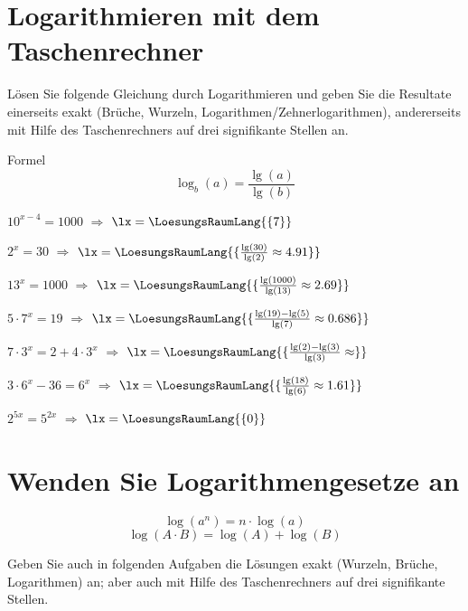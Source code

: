 \platzFuerBerechnungenBisEndeSeite{}

\section{Logarithmieren mit dem Taschenrechner}
Lösen Sie folgende Gleichung durch Logarithmieren und geben Sie die
Resultate einerseits exakt (Brüche, Wurzeln, Logarithmen/Zehnerlogarithmen), andererseits mit
Hilfe des Taschenrechners auf drei signifikante Stellen an.

Formel
$$\log_b(a) = \frac{\lg(a)}{\lg(b)}$$

\begin{bbwAufgabenBlock}
\item $10^{x-4}=1000$ $\Longrightarrow$ $\lx=\LoesungsRaumLang{\{7\}}$ \plz{}
\item $2^x=30$ $\Longrightarrow$ $\lx=\LoesungsRaumLang{\{\frac{\lg(30)}{\lg(2)}\approx 4.91\}}$ \plz{}\noTRAINER{\newpage}
\item $13^x=1000$ $\Longrightarrow$ $\lx=\LoesungsRaumLang{\{\frac{\lg(1000)}{\lg(13)}\approx 2.69\}}$ \plz{}
\item $5\cdot{}7^x = 19$ $\Longrightarrow$ $\lx=\LoesungsRaumLang{\{\frac{\lg(19)-\lg(5)}{\lg(7)}\approx 0.686\}}$ \plz{}
\item $7\cdot{}3^x = 2 + 4\cdot{}3^x$ $\Longrightarrow$ $\lx=\LoesungsRaumLang{\{\frac{\lg(2)-\lg(3)}{\lg(3)}\approx  \}}$ \plz{}\noTRAINER{\newpage}
\item $3\cdot{}6^x - 36 = 6^x$ $\Longrightarrow$ $\lx=\LoesungsRaumLang{\{\frac{\lg(18)}{\lg(6)} \approx  1.61 \}}$ \plz{}
\item $2^{5x} = 5^{2x}$ $\Longrightarrow$ $\lx=\LoesungsRaumLang{\{0\}}$ \plz{}
\end{bbwAufgabenBlock}

\platzFuerBerechnungenBisEndeSeite{}

\section{Wenden Sie Logarithmengesetze an}

$$\log(a^n) = n\cdot{}\log(a)$$
$$\log(A\cdot{}B) = \log(A) + \log(B)$$

Geben Sie auch in folgenden Aufgaben die Lösungen exakt (Wurzeln,
Brüche, Logarithmen) an; aber auch mit Hilfe des Taschenrechners auf drei
signifikante Stellen.

